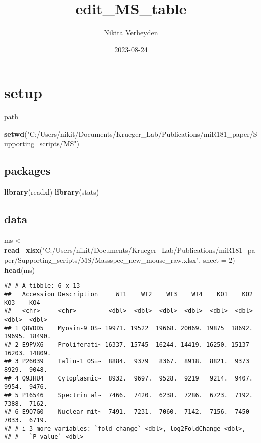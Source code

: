 \documentclass[
]{article}
\title{edit\_MS\_table}
\author{Nikita Verheyden}
\date{2023-08-24}
\newenvironment{Shaded}{\begin{snugshade}}{\end{snugshade}}
\newcommand{\AttributeTok}[1]{\textcolor[rgb]{0.13,0.29,0.53}{#1}}
\newcommand{\DecValTok}[1]{\textcolor[rgb]{0.00,0.00,0.81}{#1}}
\newcommand{\FunctionTok}[1]{\textcolor[rgb]{0.13,0.29,0.53}{\textbf{#1}}}
\newcommand{\NormalTok}[1]{#1}
\newcommand{\OtherTok}[1]{\textcolor[rgb]{0.56,0.35,0.01}{#1}}
\newcommand{\StringTok}[1]{\textcolor[rgb]{0.31,0.60,0.02}{#1}}
\begin{document}
\maketitle

\hypertarget{setup}{%
\section{setup}\label{setup}}

path

\begin{Shaded}
\begin{Highlighting}[]
\FunctionTok{setwd}\NormalTok{(}\StringTok{"C:/Users/nikit/Documents/Krueger\_Lab/Publications/miR181\_paper/Supporting\_scripts/MS"}\NormalTok{)}
\end{Highlighting}
\end{Shaded}

\hypertarget{packages}{%
\subsection{packages}\label{packages}}

\begin{Shaded}
\begin{Highlighting}[]
\FunctionTok{library}\NormalTok{(readxl)}
\FunctionTok{library}\NormalTok{(stats)}
\end{Highlighting}
\end{Shaded}

\hypertarget{data}{%
\subsection{data}\label{data}}

\begin{Shaded}
\begin{Highlighting}[]
\NormalTok{ms }\OtherTok{\textless{}{-}} \FunctionTok{read\_xlsx}\NormalTok{(}\StringTok{"C:/Users/nikit/Documents/Krueger\_Lab/Publications/miR181\_paper/Supporting\_scripts/MS/Massspec\_new\_mouse\_raw.xlsx"}\NormalTok{, }\AttributeTok{sheet =} \DecValTok{2}\NormalTok{)}
\FunctionTok{head}\NormalTok{(ms)}
\end{Highlighting}
\end{Shaded}

\begin{verbatim}
## # A tibble: 6 x 13
##   Accession Description     WT1    WT2    WT3    WT4    KO1    KO2    KO3    KO4
##   <chr>     <chr>         <dbl>  <dbl>  <dbl>  <dbl>  <dbl>  <dbl>  <dbl>  <dbl>
## 1 Q8VDD5    Myosin-9 OS~ 19971. 19522  19668. 20069. 19875  18692. 19695. 18490.
## 2 E9PVX6    Proliferati~ 16337. 15745  16244. 14419. 16250. 15137  16203. 14809.
## 3 P26039    Talin-1 OS=~  8884.  9379   8367.  8918.  8821.  9373   8929.  9048.
## 4 Q9JHU4    Cytoplasmic~  8932.  9697.  9528.  9219   9214.  9407.  9954.  9476.
## 5 P16546    Spectrin al~  7466.  7420.  6238.  7286.  6723.  7192.  7388.  7162.
## 6 E9Q7G0    Nuclear mit~  7491.  7231.  7060.  7142.  7156.  7450   7033.  6719.
## # i 3 more variables: `fold change` <dbl>, log2FoldChange <dbl>,
## #   `P-value` <dbl>
\end{verbatim}
\end{document}
